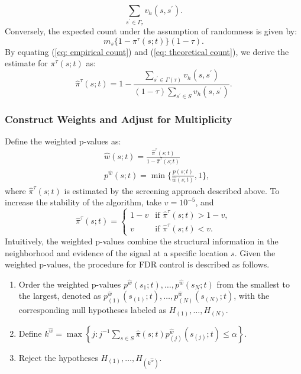 \documentclass[11pt]{article}
\begin{document}
 \begin{equation}\label{eq: empirical count}
 	\sum_{s^{\prime}\in \Gamma_{\tau}}v_h(s,s^{\prime}).
 \end{equation}
 Conversely, the expected count under the assumption of randomness is given by:
 \begin{equation}\label{eq: theoretical count}
 	m_s\{1-\pi^{\tau}(s;t)\}(1-\tau).
 \end{equation}
By equating (\ref{eq: empirical count}) and (\ref{eq: theoretical count}), we derive the estimate for $\pi^{\tau}(s;t)$ as:
\begin{equation}
	\hat{\pi}^{\tau}(s;t)=1-\frac{\sum_{s^{\prime}\in \Gamma(\tau)}v_h(s,s^{\prime})}{(1-\tau)\sum_{s^{\prime}\in S}v_h(s,s^{\prime})}.
\end{equation}

 
 
 

\subsubsection*{Construct Weights and Adjust for Multiplicity}

Define the weighted p-values as:
\begin{align}
	&\hat{w}(s;t)=\frac{\hat{\pi}^{\tau}(s;t)}{1-\hat{\pi}^{\tau}(s;t)}\\
	&p^{\hat{w}}(s;t)=\min\{\frac{p(s;t)}{\hat{w}(s;t)},1\},
\end{align}
where $\hat{\pi}^{\tau}(s;t)$ is estimated by the screening approach described above. To increase the stability of the algorithm, take  $v=10^{-5}$, and 
\begin{equation}
	\hat{\pi}^{\tau}(s;t) = 
\begin{cases} 
1-v & \text{if } \hat{\pi}^{\tau}(s;t)>1-v, \\
v & \text{if } \hat{\pi}^{\tau}(s;t) < v.
\end{cases}
\end{equation}
Intuitively, the weighted p-values combine the structural information in the neighborhood and evidence of the signal at a specific location $s$. Given the weighted p-values,
the procedure for FDR control is described as follows.

\begin{enumerate}
    \item Order the weighted p-values $p^{\hat{w}}(s_1;t), \ldots, p^{\hat{w}}(s_N;t)$ from the smallest to the largest, denoted as $p_{(1)}^{\hat{w}}(s_{(1)};t), \ldots, p_{(N)}^{\hat{w}}(s_{(N)};t)$, with the corresponding null hypotheses labeled as $H_{(1)}, \ldots, H_{(N)}$. 
    \item Define $k^{\hat{w}} = \max\left\{j : j^{-1}\sum_{s \in S} \hat{\pi}(s;t)p_{(j)}^{\hat{w}}(s_{(j)};t) \leq \alpha\right\}$.
    \item Reject the hypotheses $H_{(1)}, \ldots, H_{(k^{\hat{w}})}$.  
\end{enumerate}	
\end{document}
